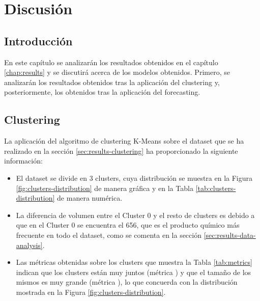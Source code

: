 
\chapter{Discusión} %
\label{chap:discussion} %


\section{Introducción}

En este capítulo se analizarán los resultados obtenidos en el capítulo \ref{chap:results} y se discutirá acerca de los modelos obtenidos. Primero, se analizarán los resultados obtenidos tras la aplicación del clustering y, posteriormente, los obtenidos tras la aplicación del forecasting.






\section{Clustering}

La aplicación del algoritmo de clustering K-Means \citep{scikit-learn} sobre el dataset \citep{dataset} que se ha realizado en la sección \ref{sec:results-clustering} ha proporcionado la siguiente información:

\begin{itemize}
 \item El dataset se divide en 3 clusters, cuya distribución se muestra en la Figura \ref{fig:clusters-distribution} de manera gráfica y en la Tabla \ref{tab:clusters-distribution} de manera numérica.
 
 \item La diferencia de volumen entre el Cluster 0 y el resto de clusters es debido a que en el Cluster 0 se encuentra el  656, que es el producto químico más frecuente en todo el dataset, como se comenta en la sección \ref{sec:results-data-analysis}.

 \item Las métricas obtenidas sobre los clusters que muestra la Tabla \ref{tab:metrics} indican que los clusters están muy juntos (métrica ) y que el tamaño de los mismos es muy grande (métrica ), lo que concuerda con la distribución mostrada en la Figura \ref{fig:clusters-distribution}.
\end{itemize}

